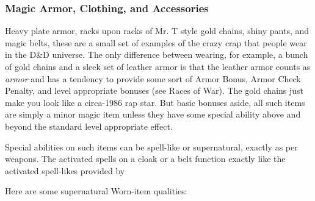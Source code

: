 \subsubsection{Magic Armor, Clothing, and Accessories}
\vspace*{-8pt}

Heavy plate armor, racks upon racks of Mr. T style gold chains, shiny pants, and magic belts, these are a small set of examples of the crazy crap that people wear in the D\&D universe. The only difference between wearing, for example, a bunch of gold chains and a sleek set of leather armor is that the leather armor counts as \textit{armor} and has a tendency to provide some sort of Armor Bonus, Armor Check Penalty, and level appropriate bonuses (see Races of War). The gold chains just make you look like a circa-1986 rap star. But basic bonuses aside, all such items are simply a minor magic item unless they have some special ability above and beyond the standard level appropriate effect.

Special abilities on such items can be spell-like or supernatural, exactly as per weapons. The activated spells on a cloak or a belt function exactly like the activated spell-likes provided by

Here are some supernatural Worn-item qualities:

